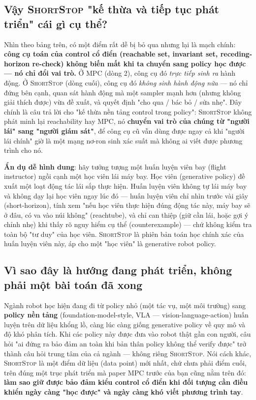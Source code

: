 \documentclass[a4paper,12pt]{article}
\newcommand{\st}{\textsc{ShortStop}}
\begin{document}
\subsection{Vậy \st{} "kế thừa và tiếp tục phát triển" cái gì cụ thể?}
Nhìn theo bảng trên, có một điểm rất dễ bị bỏ qua nhưng lại là mạch chính: \textbf{công cụ toán của control cổ điển (reachable set, invariant set, receding-horizon re-check) không biến mất khi ta chuyển sang policy học được --- nó chỉ đổi vai trò.} Ở MPC (dòng 2), công cụ đó \emph{trực tiếp sinh ra} hành động. Ở \st{} (dòng cuối), công cụ đó \emph{không sinh hành động nữa} --- nó chỉ đứng bên cạnh, quan sát hành động mà một sampler mạnh hơn (nhưng không giải thích được) vừa đề xuất, và quyết định "cho qua / bác bỏ / sửa nhẹ". Đây chính là câu trả lời cho "kế thừa nền tảng control trong policy": \st{} không phát minh lại reachability hay MPC, nó \textbf{chuyển vai trò của chúng từ "người lái" sang "người giám sát"}, để công cụ cũ vẫn dùng được ngay cả khi "người lái chính" giờ là một mạng nơ-ron sinh xác suất mà không ai viết được phương trình cho nó.

\textbf{Ẩn dụ dễ hình dung}: hãy tưởng tượng một huấn luyện viên bay (flight instructor) ngồi cạnh một học viên lái máy bay. Học viên (generative policy) đề xuất một loạt động tác lái sắp thực hiện. Huấn luyện viên không tự lái máy bay và không dạy lại học viên ngay lúc đó --- huấn luyện viên chỉ nhìn trước vài giây (short-horizon), tính xem "nếu học viên thực hiện đúng động tác này, máy bay sẽ ở đâu, có va vào núi không" (reachtube), và chỉ can thiệp (giữ cần lái, hoặc gợi ý chỉnh nhẹ) khi thấy rõ nguy hiểm cụ thể (counterexample) --- chứ không kiểm tra toàn bộ "tư duy" của học viên. \st{} là phiên bản toán học chính xác của huấn luyện viên này, áp cho một "học viên" là generative robot policy.

\subsection{Vì sao đây là hướng đang phát triển, không phải một bài toán đã xong}
Ngành robot học hiện đang đi từ policy nhỏ (một tác vụ, một môi trường) sang \textbf{policy nền tảng} (foundation-model-style, VLA --- vision-language-action) huấn luyện trên dữ liệu khổng lồ, càng lúc càng giống generative policy về quy mô và độ khó phân tích. Khi các policy này được đưa vào robot thật gần con người, câu hỏi "ai đứng ra bảo đảm an toàn khi bản thân policy không thể verify được" trở thành câu hỏi trung tâm của cả ngành --- không riêng \st{}. Nói cách khác, \st{} là một điểm dữ liệu (data point) mới nhất, chứ chưa phải điểm cuối, trên đúng một trục phát triển mà paper MPC trước của bạn cũng nằm trên đó: \textbf{làm sao giữ được bảo đảm kiểu control cổ điển khi đối tượng cần điều khiển ngày càng "học được" và ngày càng khó viết phương trình tay}.
\end{document}
